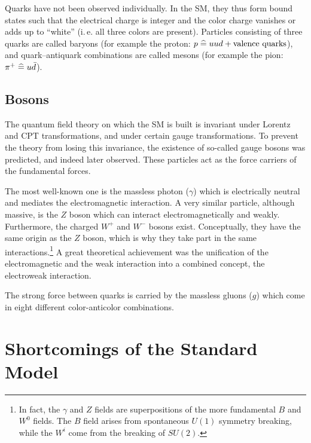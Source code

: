 Quarks have not been observed individually. In the SM, they thus form bound states such that the electrical charge is integer and the color charge vanishes or adds up to ``white'' (i.\,e. all three colors are present). Particles consisting of three quarks are called baryons (for example the proton: $p \mathrel{\widehat{=}} uud + \textrm{valence quarks}$), and quark--antiquark combinations are called mesons (for example the pion: $\pi^+ \mathrel{\widehat{=}} u \bar d$).

\subsection{Bosons}
The quantum field theory on which the SM is built is invariant under Lorentz and CPT transformations, and under certain gauge transformations. To prevent the theory from losing this invariance, the existence of so-called gauge bosons was predicted, and indeed later observed. These particles act as the force carriers of the fundamental forces.

The most well-known one is the massless photon ($\gamma$) which is electrically neutral and mediates the electromagnetic interaction. A very similar particle, although massive, is the $Z$ boson which can interact electromagnetically and weakly. Furthermore, the charged $W^+$ and $W^-$ bosons exist. Conceptually, they have the same origin as the $Z$ boson, which is why they take part in the same interactions.\footnote{In fact, the $\gamma$ and $Z$ fields are superpositions of the more fundamental $B$ and $W^0$ fields. The $B$ field arises from spontaneous $U(1)$ symmetry breaking, while the $W^i$ come from the breaking of $SU(2)$.} A great theoretical achievement was the unification of the electromagnetic and the weak interaction into a combined concept, the electroweak interaction.

The strong force between quarks is carried by the massless gluons ($g$) which come in eight different color-anticolor combinations.

\section{Shortcomings of the Standard Model}
\label{sec:Theory/Shortcomings}

